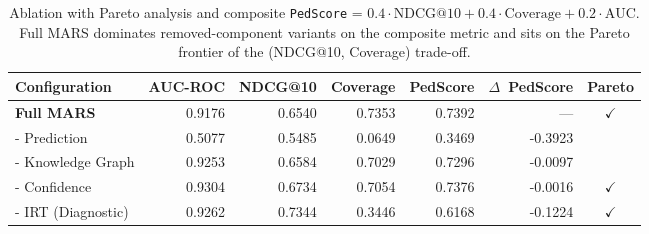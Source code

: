 \begin{table}[t]
\centering
\caption{Ablation with Pareto analysis and composite \texttt{PedScore} =
$0.4\cdot\mathrm{NDCG@10} + 0.4\cdot\mathrm{Coverage} + 0.2\cdot\mathrm{AUC}$.
Full MARS dominates removed-component variants on the composite metric and
sits on the Pareto frontier of the (NDCG@10, Coverage) trade-off.}
\label{tab:ablation_pareto}
\begin{tabular}{lrrrrrc}
\toprule
Configuration & AUC-ROC & NDCG@10 & Coverage & PedScore & $\Delta$~PedScore & Pareto \\
\midrule
\textbf{Full MARS} & 0.9176 & 0.6540 & 0.7353 & 0.7392 & --- & $\checkmark$ \\
- Prediction & 0.5077 & 0.5485 & 0.0649 & 0.3469 & -0.3923 &  \\
- Knowledge Graph & 0.9253 & 0.6584 & 0.7029 & 0.7296 & -0.0097 &  \\
- Confidence & 0.9304 & 0.6734 & 0.7054 & 0.7376 & -0.0016 & $\checkmark$ \\
- IRT (Diagnostic) & 0.9262 & 0.7344 & 0.3446 & 0.6168 & -0.1224 & $\checkmark$ \\
\bottomrule
\end{tabular}
\end{table}
